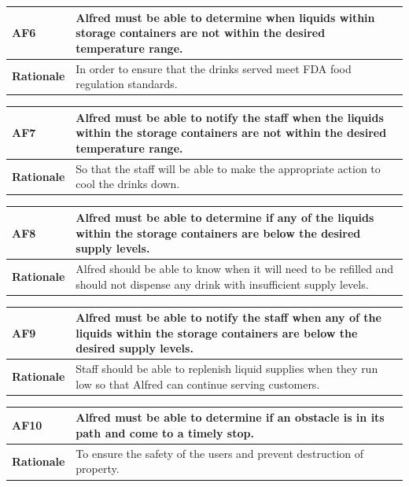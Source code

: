 \documentclass [11pt]{article}
\begin{document}
\begin{longtable}{| p{ } | p{ } | }\hline 
\rowcolor{tableCell}\textbf{AF6} & Alfred must be able to determine when liquids within storage containers are not within the desired temperature range.\\ \hline
\textbf{Rationale} &  In order to ensure that the drinks served meet FDA food regulation standards. \\ \hline 
\end{longtable}

\begin{longtable}{| p{ } | p{ } | }\hline 
\rowcolor{tableCell}\textbf{AF7} & Alfred must be able to notify the staff when the liquids within the storage containers are not within the desired temperature range.\\ \hline
\textbf{Rationale} &  So that the staff will be able to make the appropriate action to cool the drinks down.\\ \hline 
\end{longtable}

\begin{longtable}{| p{ } | p{ } | }\hline 
\rowcolor{tableCell}\textbf{AF8} & Alfred must be able to determine if any of the liquids within the storage containers are below the desired supply levels. \\ \hline
\textbf{Rationale} &  Alfred should be able to know when it will need to be refilled and should not dispense any drink with insufficient supply levels.\\ \hline 
\end{longtable}

\begin{longtable}{| p{ } | p{ } | }\hline 
\rowcolor{tableCell}\textbf{AF9} & Alfred must be able to notify the staff when any of the liquids within the storage containers are below the desired supply levels. \\ \hline 
\textbf{Rationale} &  Staff should be able to replenish liquid supplies when they run low so that Alfred can continue serving customers. \\ \hline
\end{longtable}

\begin{longtable}{| p{ } | p{ } | }\hline 
\rowcolor{tableCell}\textbf{AF10} & Alfred must be able to determine if an obstacle is in its path and come to a timely stop. \\ \hline
\textbf{Rationale} &  To ensure the safety of the users and prevent destruction of property. \\ \hline 
\end{longtable}
\end{document}
